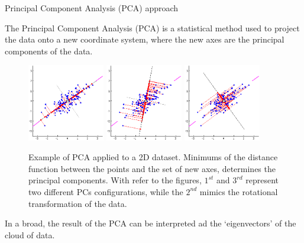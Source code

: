 \begin{frame}{Principal Component Analysis (PCA) approach}

    The Principal Component Analysis (PCA) is a statistical method used to project the data onto a new coordinate system, where the new axes are the principal components of the data.

    \begin{figure}[H]
        \centering
        \includegraphics[width=0.3\textwidth]{img/principal-components-01.png}
        \hfill
        \includegraphics[width=0.3\textwidth]{img/principal-components-02.png}
        \hfill
        \includegraphics[width=0.3\textwidth]{img/principal-components-03.png}
        \caption{Example of PCA applied to a 2D dataset. Minimums of the distance function between the points and the set of new axes, determines the principal components. With refer to the figures, $1^{st}$ and $3^{rd}$ represent two different PCs configurations, while the $2^{nd}$ mimics the rotational transformation of the data.}
    \end{figure}

    In a broad, the result of the PCA can be interpreted ad the `eigenvectors' of the cloud of data.

\end{frame}



